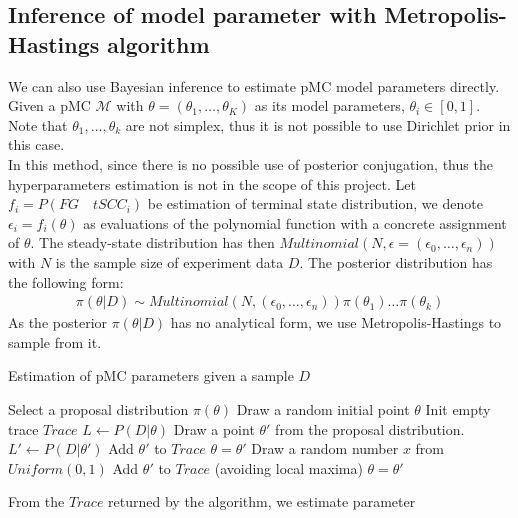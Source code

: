 \documentclass[12pt]{article}
\theoremstyle{definition}
\begin{document}
\subsection{Inference of model parameter with Metropolis-Hastings algorithm}
We can also use Bayesian inference to estimate pMC model parameters directly.
Given a pMC $\mathcal{M}$ with $\theta=(\theta_1,\ldots,\theta_{K})$ as its model
parameters, $\theta_i \in [0,1]$. Note that $\theta_1,\ldots,\theta_k$ are not
simplex, thus it is not possible to use Dirichlet prior in this case. \\
In this method, since there is no possible use of posterior conjugation, thus
the hyperparameters estimation is not in the scope of this project. Let
$f_i = P (FG\quad tSCC_i)$ be estimation of terminal state
distribution, we denote $\epsilon_i = f_i(\theta)$ as evaluations of the
polynomial function with a concrete assignment of $\theta$. The steady-state
distribution has then $Multinomial(N, \epsilon =
(\epsilon_0,\ldots,\epsilon_n))$ with $N$ is the sample size of experiment data
$D$. The posterior distribution has the following form:
\begin{align*}
  \pi(\theta|D) \sim Multinomial(N, (\epsilon_0,\ldots,\epsilon_n))\pi(\theta_1)\ldots\pi(\theta_k)
\end{align*}
As the posterior $\pi(\theta|D)$ has no analytical form, we use
Metropolis-Hastings to sample from it.
\begin{algorithm}[H]
  \caption{Estimation of pMC parameters given a sample $D$}\label{exp_b}
  \begin{algorithmic}[1]
    \State Select a proposal distribution $\pi(\theta)$
    \State Draw a random initial point $\theta$
    \State Init empty trace $Trace$
    \State $L \leftarrow P(D|\theta)$
    \State Draw a point $\theta'$ from the proposal distribution.
    \State $L' \leftarrow P(D|\theta')$
    \State Add $\theta'$ to $Trace$
    \State $\theta = \theta'$
    \Else
    \State Draw a random number $x$ from $Uniform(0,1)$
    \State Add $\theta'$ to $Trace$ (avoiding local maxima)
    \State $\theta = \theta'$
    \EndIf
    \EndIf
    \EndWhile
    \EndProcedure
  \end{algorithmic}
\end{algorithm}

From the $Trace$ returned by the algorithm, we estimate parameter 
\end{document}
